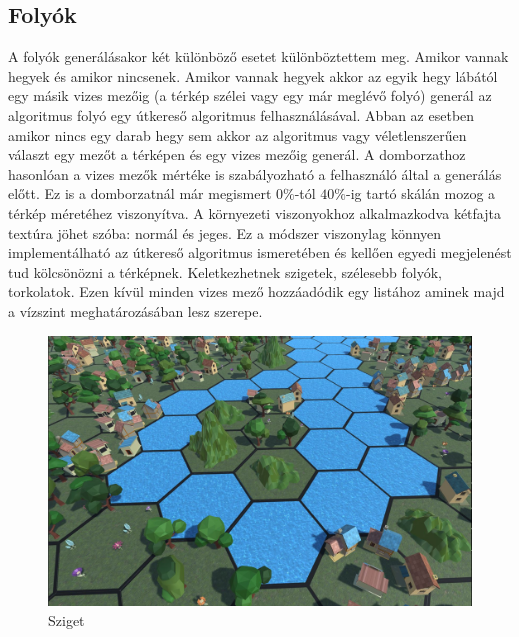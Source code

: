\subsection{Folyók}

A folyók generálásakor két különböző esetet különböztettem meg. Amikor vannak hegyek és amikor nincsenek. Amikor vannak hegyek akkor az egyik hegy lábától egy másik vizes mezőig (a térkép szélei vagy egy már meglévő folyó) generál az algoritmus folyó egy útkereső algoritmus felhasználásával. Abban az esetben amikor nincs egy darab hegy sem akkor az algoritmus vagy véletlenszerűen választ egy mezőt a térképen és egy vizes mezőig generál. A domborzathoz hasonlóan a vizes mezők mértéke is szabályozható a felhasználó által a generálás előtt. Ez is a domborzatnál már megismert $0\%$-tól $40\%$-ig tartó skálán mozog a térkép méretéhez viszonyítva. A környezeti viszonyokhoz alkalmazkodva kétfajta textúra jöhet szóba: normál és jeges. Ez a módszer viszonylag könnyen implementálható az útkereső algoritmus ismeretében és kellően egyedi megjelenést tud kölcsönözni a térképnek. Keletkezhetnek szigetek, szélesebb folyók, torkolatok. Ezen kívül minden vizes mező hozzáadódik egy listához aminek majd a vízszint meghatározásában lesz szerepe.

\begin{figure}[h!]
\centering
\includegraphics[scale=0.3]{kepek/img11_4_3_1.JPG}
\caption{Sziget}
\label{fig:img11_4_3_1}
\end{figure}

